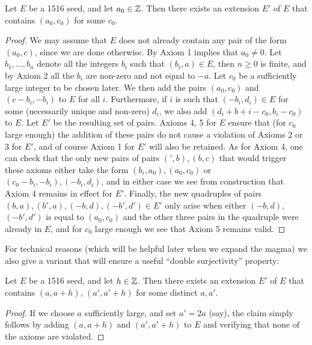 \begin{lemma}[1516 extension]\label{1516-ext}  Let $E$ be a 1516 seed, and let $a_0 \in \mathbb{Z}$.  Then there exists an extension $E'$ of $E$ that contains $(a_0,c_0)$ for some $c_0$.
\end{lemma}

\begin{proof}  We may assume that $E$ does not already contain any pair of the form $(a_0,c)$, since we are done otherwise.  By Axiom 1 implies that $a_0 \neq 0$.  Let $b_1,\dots,b_n$ denote all the integers $b_i$ such that $(b_i,a) \in E$, then $n \geq 0$ is finite, and by Axiom 2 all the $b_i$ are non-zero and not equal to $-a$.  Let $c_0$ be a sufficiently large integer to be chosen later.  We then add the pairs $(a_0,c_0)$ and $(c-b_i,-b_i)$ to $E$ for all $i$.  Furthermore, if $i$ is such that $(-b_i,d_i) \in E$ for some (necessarily unique and non-zero) $d_i$, we also add $(d_i+b+i-c_0, b_i-c_0)$ to $E$.  Let $E'$ be the resulting set of pairs. Axioms 4, 5 for $E$ ensure that (for $c_0$ large enough) the addition of these pairs do not cause a violation of Axioms 2 or 3 for $E'$, and of course Axiom 1 for $E'$ will also be retained.  As for Axiom 4, one can check that the only new pairs of pairs $(',b), (b,c)$ that would trigger these axioms either take the form $(b_i,a_0), (a_0,c_0)$ or $(c_0-b_i,-b_i), (-b_i,d_i)$, and in either case we see from construction that Axiom 4 remains in effect for $E'$.  Finally, the new quadruples of pairs $(b,a), (b',a), (-b, d), (-b',d') \in E'$ only arise when either $(-b,d)$, $(-b',d')$ is equal to $(a_0,c_0)$ and the other three pairs in the quadruple were already in $E$, and for $c_0$ large enough we see that Axiom 5 remains valid.
\end{proof}

For technical reasons (which will be helpful later when we expand the magma) we also give a variant that will ensure a useful ``double surjectivity'' property:

\begin{lemma}\label{1516-ext-var}  Let $E$ be a 1516 seed, and let $h \in \mathbb{Z}$.  Then there exists an extension $E'$ of $E$ that contains $(a,a+h)$, $(a',a'+h)$ for some distinct $a,a'$.
\end{lemma}

\begin{proof}  If we choose $a$ sufficiently large, and set $a' = 2a$ (say), the claim simply follows by adding $(a,a+h)$ and $(a',a'+h)$ to $E$ and verifying that none of the axioms are violated.
\end{proof}


